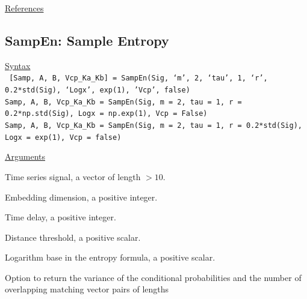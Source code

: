 \documentclass[12pt, a4paper, titlepage, openany]{book}
\begin{document}
\noindent \ul{References}\hspace{1cm}
\cite{Ap1}



\newpage
\subsection{\normalsize SampEn: \hspace{15mm} Sample Entropy}\label{SampEn}
\noindent\ul{Syntax} \vspace{6mm} \\ \noindent \texttt{\footnotesize
[Samp, A, B, Vcp\_Ka\_Kb] = SampEn(Sig, ‘m’, 2, ‘tau’, 1, ‘r’, 0.2*std(Sig), ‘Logx’, exp(1), 'Vcp', false) \\
Samp, A, B, Vcp\_Ka\_Kb   = SampEn(Sig, m = 2, tau = 1, r = 0.2*np.std(Sig), Logx = np.exp(1), Vcp = False) \\
Samp, A, B, Vcp\_Ka\_Kb   = SampEn(Sig, m = 2, tau = 1, r = 0.2*std(Sig), Logx = exp(1), Vcp = false)}

\noindent \ul{Arguments}
\begin{description}[labelsep=1cm, labelwidth=2cm, nosep, style=multiline,leftmargin=3cm]\footnotesize
\item[\texttt{Sig}]		Time series signal, a vector of length $> 10$.
\item[\texttt{m}]		Embedding dimension, a positive integer.
\item[\texttt{tau}]		Time delay, a positive integer.
\item[\texttt{r}]		Distance threshold, a positive scalar.
\item[\texttt{Logx}]	Logarithm base in the entropy formula, a positive scalar.
\item[\texttt{Vcp}]		Option to return the variance of the conditional probabilities and the number of overlapping matching vector pairs of lengths \cite{Samp2}

\end{description}
\end{document}
